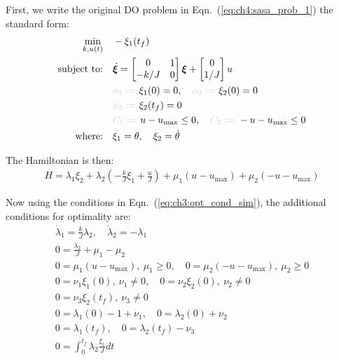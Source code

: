 First, we write the original DO problem in Eqn.~(\ref{eq:ch4:sasa_prob_1}) the standard form:
\begin{subequations}
\label{eq:ch4:sasa_prob_2}
\begin{align}
\min_{k,u(t)} \quad & - \xi_1(t_f) \\
\text{subject to:} \quad & \dot{\bm{\xi}} = \begin{bmatrix} 0 & 1 \\ -k/J & 0 \end{bmatrix} \bm{\xi} + \begin{bmatrix} 0 \\ 1/J \end{bmatrix} u \\
& \textcolor{light-gray}{\phi_1 := }\ \xi_1(0) = 0, \quad \textcolor{light-gray}{\phi_2 := }\  \xi_2(0) = 0 \\
& \textcolor{light-gray}{\phi_3 := }\  \xi_2(t_f) = 0 \\ 
& \textcolor{light-gray}{C_1 := }\  u - u_{\max} \leq 0, \quad \textcolor{light-gray}{C_2 := }\ -u - u_{\max} \leq 0 \\
\text{where:} \quad & \xi_1 = \theta, \quad \xi_2 = \dot{\theta}
\end{align}
\end{subequations}

\noindent The Hamiltonian is then:
\begin{align}
H = \lambda_1 \xi_2 + \lambda_2 \left( -\frac{k}{J} \xi_1 + \frac{u}{J} \right) + \mu_1 \left( u - u_{\max} \right) + \mu_2 \left( -u - u_{\max} \right)
\end{align}

\noindent Now using the conditions in Eqn.~(\ref{eq:ch3:opt_cond_sim}), the additional conditions for optimality are:
\begingroup
\allowdisplaybreaks
\begin{subequations}
\label{eq:ch4:sasa_cond_1}
\begin{gather}
\dot{\lambda}_1 = \frac{k}{J} \lambda_2, \quad \dot{\lambda}_2 = -\lambda_1  \\
0 = \frac{\lambda_2}{J} + \mu_1 - \mu_2 \\
0 = {\mu}_1 \left( u - u_{\max} \right), \ {\mu}_1 \geq 0, \quad 0 = {\mu}_2 \left( -u - u_{\max} \right), \ {\mu}_2 \geq 0 \\
0 = \nu_1 \xi_1(0), \ \nu_1 \neq 0, \quad 0 = \nu_2 \xi_2(0), \ \nu_2 \neq 0    \\
0 = \nu_3 \xi_2(t_f), \ \nu_3 \neq 0 \\
0 = \lambda_1(0) - 1 + \nu_1, \quad 0 = \lambda_2(0) + \nu_2 \\
0 = \lambda_1(t_f), \quad 0 = \lambda_2(t_f) - \nu_3 \\
0 = \int_0^{t_f} \lambda_2 \frac{\xi_1}{J} dt
\end{gather}
\end{subequations}%
\endgroup

